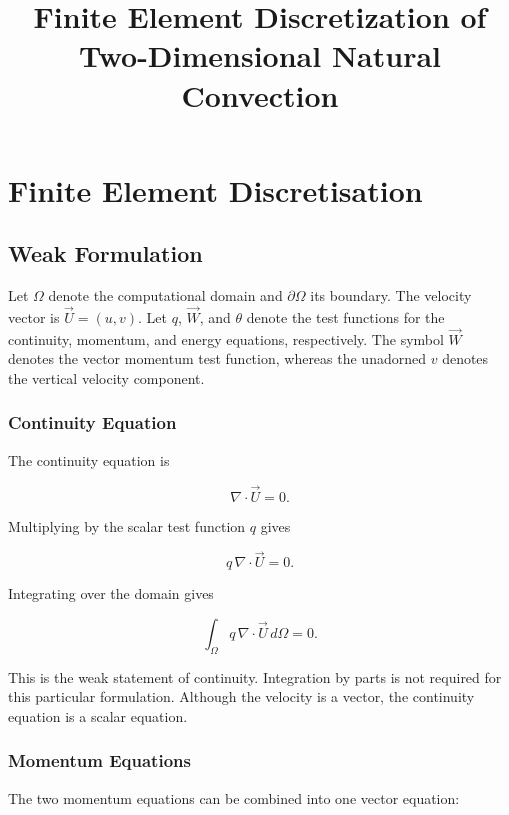\documentclass[preprint,3p,number]{elsarticle}
\title{Finite Element Discretization of Two-Dimensional Natural Convection}
\author{}
\date{}
\begin{document}
\maketitle

\section{Finite Element Discretisation}

\subsection{Weak Formulation}

Let $\Omega$ denote the computational domain and
$\partial\Omega$ its boundary. The velocity vector is
$\vec{U}=(u,v)$. Let $q$, $\vec{W}$,
and $\theta$ denote the test functions for the continuity,
momentum, and energy equations, respectively. The symbol
$\vec{W}$ denotes the vector momentum test function,
whereas the unadorned $v$ denotes the vertical velocity
component.

\subsubsection{Continuity Equation}

The continuity equation is

\begin{equation}
\nabla\cdot\vec{U}=0.
\end{equation}

Multiplying by the scalar test function $q$ gives

\[
q\,\nabla\cdot\vec{U}=0.
\]

Integrating over the domain gives

\begin{equation}
\boxed{
\int_{\Omega}q\,\nabla\cdot\vec{U}\,d\Omega=0.
}
\end{equation}

This is the weak statement of continuity. Integration by
parts is not required for this particular formulation.
Although the velocity is a vector, the continuity equation
is a scalar equation.

\subsubsection{Momentum Equations}

The two momentum equations can be combined into one
vector equation:
\end{document}
